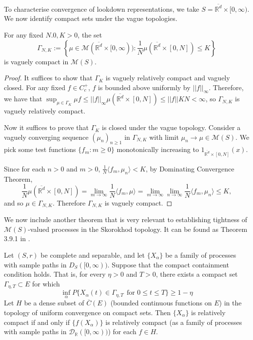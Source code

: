 To characterise convergence of lookdown representations,
we take $S = \overline{\mathbb{R}^d} \times [0,\infty)$.
We now identify compact sets under the vague topologies.

\begin{lemma}
\label{lem: vague compact sets}
For any fixed $N.0, K>0$, the set 
$$\Gamma_{N,K} := \left\{\mu \in \mathcal{M}(\overline{\mathbb{R}^d} \times [0,\infty)):  \frac{1}{N}\mu(\overline{\mathbb{R}^d}\times [0,N]) \leq K \right\}$$
is vaguely compact in $\mathcal{M}(S)$.
\end{lemma}

\begin{proof}
It suffices to show that $\Gamma_K$ is vaguely relatively compact and vaguely closed.
For any fixed $f \in C^{+}_c$, $f$ is bounded above uniformly by $||f||_{\infty}$.
Therefore, 
we have that $ \sup_{\mu \in  \Gamma_K} \mu f \leq  ||f||_{\infty} \mu(\overline{\mathbb{R}^d}\times [0,N])  \leq ||f|| K N < \infty$,
so $\Gamma_{N,K}$ is vaguely relatively compact.

Now it suffices to prove that $\Gamma_K$ is closed under the vague topology.
Consider a vaguely converging sequence $(\mu_n)_{n \geq 1}$ in $\Gamma_{N,K}$
with limit $\mu_n \to \mu \in \mathcal{M}(S)$.
We pick some test functions $\{f_m : m \geq 0 \}$ monotonically increasing to $1_{\overline{\mathbb{R}^d}\times[0,N]}(x)$.

Since for each $n>0$ and $m > 0$,
$\frac{1}{N}\langle f_m , \mu_n \rangle < K$,
by Dominating Convergence Theorem,
\begin{equation}
\frac{1}{N}\mu(\overline{\mathbb{R}^d}\times [0,N])
= \lim_{m \to \infty} \frac{1}{N}\langle f_m , \mu \rangle
=\lim_{m \to \infty} \lim_{n \to \infty} \frac{1}{N}\langle f_m , \mu_n \rangle
\leq K,
\end{equation}
and so $\mu \in \Gamma_{N,K}$.
Therefore $\Gamma_{N,K}$ is vaguely compact. 
\end{proof}


We now include another theorem that is very relevant to establishing tightness of $\mathcal{M}(S)$-valued processes in the Skorokhod topology. It can be found as Theorem 3.9.1 in \cite{EK}.

\begin{theorem}
\label{teo: EK tightness theorem}
Let $(S,r)$ be complete and separable, and let $\{X_{\alpha}\}$ be a family of processes with sample paths in $D_{S}([0,\infty))$.
Suppose that the compact containment condition holds. That is, for every $\eta > 0$ and $T > 0$,
there exists a compact set $\Gamma_{\eta, T} \subset E$ for which 
\begin{equation}
\inf_{\alpha} P \{ X_{\alpha}(t) \in \Gamma_{\eta,T}  ~~ \text{for } 0\leq t \leq T\} \geq 1- \eta
\end{equation}
Let $H$ be a dense subset of $\overline{C}(E)$ (bounded continuous functions on $E$) in the topology of uniform convergence on compact sets. 
Then $\{X_{\alpha}\}$ is relatively compact if and only if $\{f(X_{\alpha})\}$ is relatively compact (as a family of processes with sample paths in $\mathcal{D}_{\mathbb{R}}([0,\infty))$) for each $f \in H$.
\end{theorem}


